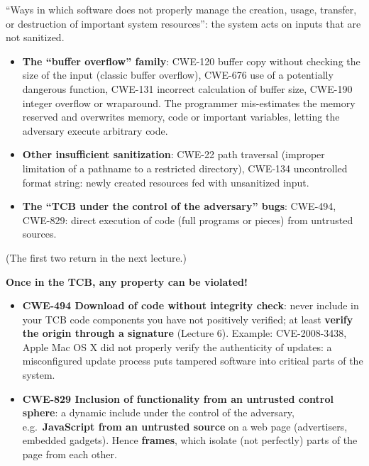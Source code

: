 \begin{defnbox}[title={Risky resource management}]
``Ways in which software does not properly manage the creation, usage, transfer, or destruction of
important system resources'': the system acts on inputs that are not sanitized.
\begin{itemize}
  \item \textbf{The ``buffer overflow'' family}: CWE-120 buffer copy without checking the size of
        the input (classic buffer overflow), CWE-676 use of a potentially dangerous function,
        CWE-131 incorrect calculation of buffer size, CWE-190 integer overflow or wraparound. The
        programmer mis-estimates the memory reserved and overwrites memory, code or important
        variables, letting the adversary execute arbitrary code.
  \item \textbf{Other insufficient sanitization}: CWE-22 path traversal (improper limitation of a
        pathname to a restricted directory), CWE-134 uncontrolled format string: newly created
        resources fed with unsanitized input.
  \item \textbf{The ``TCB under the control of the adversary'' bugs}: CWE-494, CWE-829: direct
        execution of code (full programs or pieces) from untrusted sources.
\end{itemize}
(The first two return in the next lecture.)
\end{defnbox}

\begin{warnbox}[title={The TCB under the control of the adversary}]
\textbf{Once in the TCB, any property can be violated!}
\begin{itemize}
  \item \textbf{CWE-494 Download of code without integrity check}: never include in your TCB code
        components you have not positively verified; at least \textbf{verify the origin through a
        signature} (Lecture 6). Example: CVE-2008-3438, Apple Mac OS X did not properly verify
        the authenticity of updates: a misconfigured update process puts tampered software into
        critical parts of the system.
  \item \textbf{CWE-829 Inclusion of functionality from an untrusted control sphere}: a dynamic
        include under the control of the adversary, e.g.\ \textbf{JavaScript from an untrusted
        source} on a web page (advertisers, embedded gadgets). Hence \textbf{frames}, which isolate
        (not perfectly) parts of the page from each other.
\end{itemize}
\end{warnbox}

